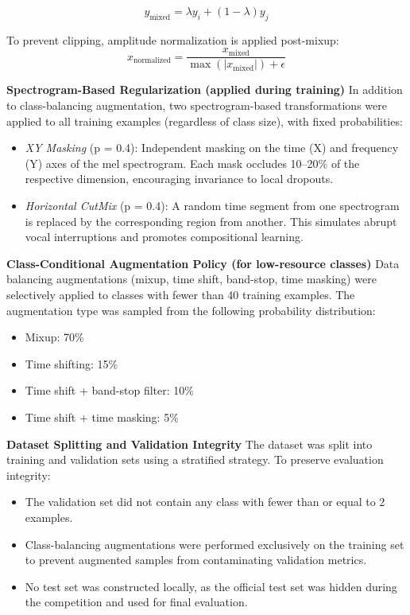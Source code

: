 \documentclass[ERTS, 2025]{ERTS}
\begin{document}
\begin{equation}
y_{\text{mixed}} = \lambda y_i + (1-\lambda) y_j
\end{equation}

To prevent clipping, amplitude normalization is applied post-mixup:
\begin{equation}
x_{\text{normalized}} = \frac{x_{\text{mixed}}}{\max(|x_{\text{mixed}}|) + \epsilon}
\end{equation}

\textbf{Spectrogram-Based Regularization (applied during training)}
In addition to class-balancing augmentation, two spectrogram-based transformations were applied to all training examples (regardless of class size), with fixed probabilities:
\begin{itemize}
    \item \textit{XY Masking} (p = 0.4): Independent masking on the time (X) and frequency (Y) axes of the mel spectrogram. Each mask occludes 10–20\% of the respective dimension, encouraging invariance to local dropouts.
    \item \textit{Horizontal CutMix} (p = 0.4): A random time segment from one spectrogram is replaced by the corresponding region from another. This simulates abrupt vocal interruptions and promotes compositional learning.
\end{itemize}

\textbf{Class-Conditional Augmentation Policy (for low-resource classes)}
Data balancing augmentations (mixup, time shift, band-stop, time masking) were selectively applied to classes with fewer than 40 training examples. The augmentation type was sampled from the following probability distribution:
\begin{itemize}
    \item Mixup: 70\%
    \item Time shifting: 15\%
    \item Time shift + band-stop filter: 10\%
    \item Time shift + time masking: 5\%
\end{itemize}

\textbf{Dataset Splitting and Validation Integrity}
The dataset was split into training and validation sets using a stratified strategy. To preserve evaluation integrity:
\begin{itemize}
    \item The validation set did not contain any class with fewer than or equal to 2 examples.
    \item Class-balancing augmentations were performed exclusively on the training set to prevent augmented samples from contaminating validation metrics.
    \item No test set was constructed locally, as the official test set was hidden during the competition and used for final evaluation.
\end{itemize}
\end{document}
